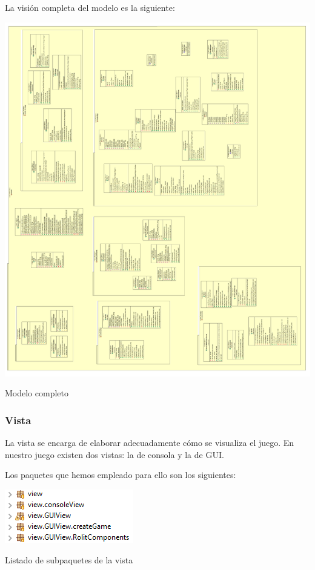 \documentclass[../DocumentoOficial.tex]{subfiles}
\begin{document}
La visión completa del modelo es la siguiente:

\begin{center}
\includegraphics[scale=0.2]{mvcmodeluml.png}

Modelo completo
\end{center}

\newpage

\subsubsection{Vista}

La vista se encarga de elaborar adecuadamente cómo se visualiza el juego. En nuestro juego existen dos vistas: la de consola y la de GUI.

Los paquetes que hemos empleado para ello son los siguientes:

\begin{center}
\includegraphics[scale=1.5]{viewpaquetes.png}

Listado de subpaquetes de la vista
\end{center}
\end{document}
